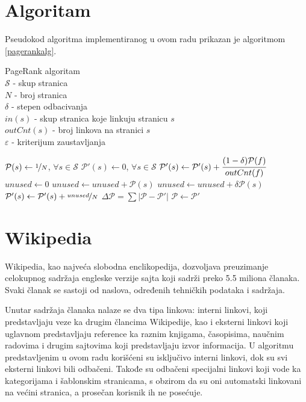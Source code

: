 \documentclass[12pt, journal, compsoc]{IEEEtran}
\begin{document}
\section{Algoritam}
Pseudokod algoritma implementiranog u ovom radu prikazan je algoritmom \ref{pagerankalg}.
\begin{algorithm}[H]
\caption{PageRank algoritam\\
$\mathcal S$ - skup stranica\\
$N$ - broj stranica\\
$\delta$ - stepen odbacivanja\\
$in(s)$ - skup stranica koje linkuju stranicu $s$\\
$outCnt(s)$ - broj linkova na stranici $s$\\
$\varepsilon$ - kriterijum zaustavljanja}
\label{pagerankalg}
\begin{algorithmic}[1]

\State $\mathcal P(s) \gets \nicefrac{1}{N}$,  $\forall s \in \mathcal S$
\Repeat
\State $\mathcal P'(s) \gets 0$, $\forall s \in \mathcal S$
        \State $\mathcal P'(s) \gets \mathcal P'(s) + \cfrac{(1 - \delta) \mathcal P(f)}{outCnt(f)}  $
    \EndFor
\EndFor
\State $unused \gets 0$
\State    $unused \gets unused+ \mathcal P(s)$
\Else
\State    $unused \gets unused + \delta \mathcal P(s)$
\EndIf
\EndFor
{}
\State  $\mathcal P'(s) \gets \mathcal P'(s) + \nicefrac{unused}{N}$
\EndFor
\State $\Delta \mathcal P = \sum{|\mathcal P - \mathcal P'|}  $
\State $\mathcal P \gets \mathcal P'$

\EndProcedure
\end{algorithmic}
\end{algorithm}


\section{Wikipedia}
Wikipedia, kao najveća slobodna enclikopedija, dozvoljava preuzimanje celokupnog sadržaja engleske verzije sajta koji sadrži preko 5.5 miliona članaka. Svaki članak se sastoji od naslova, određenih tehničkih podataka i sadržaja. 

Unutar sadržaja članaka nalaze se dva tipa linkova: interni linkovi, koji predstavljaju veze ka drugim člancima Wikipedije, kao i eksterni linkovi koji uglavnom predstavljaju reference ka raznim knjigama, časopisima, naučnim radovima i drugim sajtovima koji predstavljaju izvor informacija. U algoritmu predstavljenim u ovom radu korišćeni su isključivo interni linkovi, dok su svi eksterni linkovi bili odbačeni. Takođe su odbačeni specijalni linkovi koji vode ka kategorijama i šablonskim stranicama, s obzirom da su oni automatski linkovani na većini stranica, a prosečan korisnik ih ne posećuje.
\end{document}

